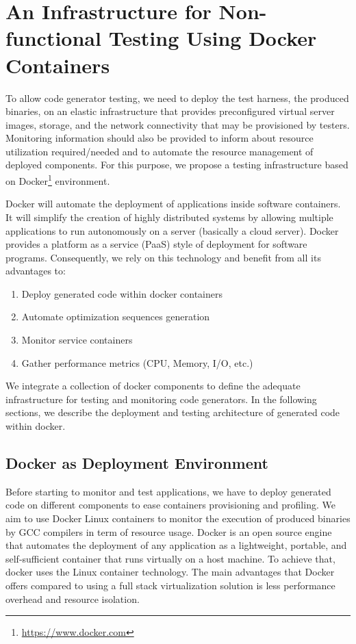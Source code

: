 \section{An Infrastructure for Non-functional Testing Using Docker Containers}

To allow code generator testing, we need to deploy the test harness, \ie the produced binaries, on an elastic infrastructure that provides preconfigured virtual server images, storage, and the network connectivity that may be provisioned by testers. 
Monitoring information should also be provided to inform about resource utilization required/needed and to automate the resource management of deployed components. 
For this purpose, we propose a testing infrastructure based on Docker\footnote{\url{https://www.docker.com}} environment. 

Docker will automate the deployment of applications inside software containers. It will simplify the creation of highly distributed systems by allowing multiple applications to run autonomously on a server (basically a cloud server). 
Docker provides a platform as a service (PaaS) style of deployment for software programs. 
Consequently, we rely on this technology and benefit from all its advantages to:
\begin{enumerate}
	\item Deploy generated code within docker containers
	\item Automate optimization sequences generation
	\item Monitor service containers
	\item Gather performance metrics (CPU, Memory, I/O, etc.)
\end{enumerate}

We integrate a collection of docker components to define the adequate infrastructure for testing and monitoring code generators. 
In the following sections, we describe the deployment and testing architecture of generated code within docker.

\subsection{Docker as Deployment Environment}

Before starting to monitor and test applications, we have to deploy generated code on different components to ease containers provisioning and profiling.
We aim to use Docker Linux containers to monitor the execution of produced binaries by GCC compilers in term of resource usage. 
Docker is an open source engine that automates the deployment of any application as a lightweight, portable, and self-sufficient container that runs virtually on a host machine. 
To achieve that, docker uses the Linux container technology. The main advantages that Docker offers compared to using a full stack virtualization solution is less performance overhead and resource isolation. 

